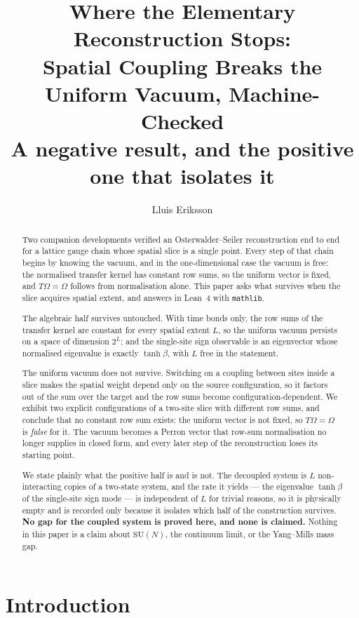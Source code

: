 \documentclass[11pt]{article}
\title{Where the Elementary Reconstruction Stops:\\
Spatial Coupling Breaks the Uniform Vacuum, Machine-Checked\\
\large A negative result, and the positive one that isolates it}
\author{Lluis Eriksson}
\date{}
\theoremstyle{definition}
\newcommand{\SU}{\mathrm{SU}}
\newcommand{\Om}{\Omega}
\begin{document}
\maketitle

\begin{abstract}
Two companion developments verified an Osterwalder--Seiler reconstruction end to
end for a lattice gauge chain whose spatial slice is a single point.  Every step
of that chain begins by knowing the vacuum, and in the one-dimensional case the
vacuum is free: the normalised transfer kernel has constant row sums, so the
uniform vector is fixed, and $T\Om=\Om$ follows from normalisation alone.  This
paper asks what survives when the slice acquires spatial extent, and answers in
Lean~4 with \texttt{mathlib}.

The algebraic half survives untouched.  With time bonds only, the row sums of
the transfer kernel are constant for every spatial extent $L$, so the uniform
vacuum persists on a space of dimension $2^L$; and the single-site sign
observable is an eigenvector whose normalised eigenvalue is exactly $\tanh\beta$,
with $L$ free in the statement.

The uniform vacuum does not survive.  Switching on a coupling between sites inside a
slice makes the spatial weight depend only on the source configuration, so it
factors out of the sum over the target and the row sums become
configuration-dependent.  We exhibit two explicit configurations of a two-site
slice with different row sums, and conclude that no constant row sum exists: the
uniform vector is not fixed, so $T\Om=\Om$ is \emph{false} for it.  The vacuum
becomes a Perron vector that row-sum normalisation no longer supplies in closed
form, and every later step of the reconstruction loses its starting point.

We state plainly what the positive half is and is not.  The decoupled system is
$L$ non-interacting copies of a two-state system, and the rate it yields --- the
eigenvalue $\tanh\beta$ of the single-site sign mode --- is independent of $L$
for trivial reasons, so it is physically empty
and is recorded only because it isolates which half of the construction
survives.  \textbf{No gap for the coupled system is proved here, and none is
claimed.}  Nothing in this paper is a claim about $\SU(N)$, the continuum limit,
or the Yang--Mills mass gap.
\end{abstract}

\section{Introduction}
\end{document}

